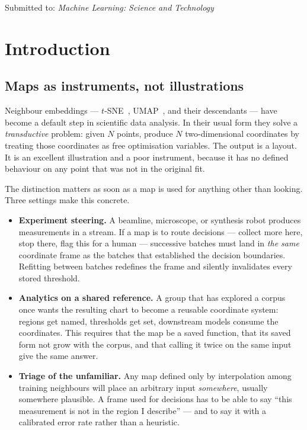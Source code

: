 \documentclass[12pt]{iopart}
\makeatletter
\gdef\lm@title{}\gdef\lm@author{}\gdef\lm@addr{}\gdef\lm@sub{}
\newcommand{\submitto}[1]{\gdef\lm@sub{\par\medskip\small Submitted to: #1}}
\newcommand{\MLST}{\emph{Machine Learning: Science and Technology}}
\renewcommand{\maketitle}{%
    \begin{center}%
      {\LARGE\bfseries\lm@title\par}\medskip
      {\large\lm@author\par}%
      \lm@addr
      \lm@sub
    \end{center}%
    \medskip\unvbox\lm@absbox\medskip\par}
\theoremstyle{definition}
\theoremstyle{plain}
\theoremstyle{remark}
\makeatother
\begin{document}
\submitto{\MLST}

\maketitle

\ifiopclass\else\tableofcontents\newpage\fi

\section{Introduction}
\label{sec:intro}

\subsection{Maps as instruments, not illustrations}

Neighbour embeddings --- $t$-SNE~\cite{vandermaaten2008tsne},
UMAP~\cite{mcinnes2018umap}, and their descendants --- have become a default
step in scientific data analysis. In their usual form they solve a
\emph{transductive} problem: given $N$ points, produce $N$ two-dimensional
coordinates by treating those coordinates as free optimisation variables. The
output is a layout. It is an excellent illustration and a poor instrument,
because it has no defined behaviour on any point that was not in the original
fit.

The distinction matters as soon as a map is used for anything other than
looking. Three settings make this concrete.

\begin{itemize}[leftmargin=*]
\item \textbf{Experiment steering.} A beamline, microscope, or synthesis robot
  produces measurements in a stream. If a map is to route decisions --- collect
  more here, stop there, flag this for a human --- successive batches must land
  in \emph{the same} coordinate frame as the batches that established the
  decision boundaries. Refitting between batches redefines the frame and
  silently invalidates every stored threshold.
\item \textbf{Analytics on a shared reference.} A group that has explored a
  corpus once wants the resulting chart to become a reusable coordinate system:
  regions get named, thresholds get set, downstream models consume the
  coordinates. This requires that the map be a saved function, that its saved
  form not grow with the corpus, and that calling it twice on the same input
  give the same answer.
\item \textbf{Triage of the unfamiliar.} Any map defined only by interpolation
  among training neighbours will place an arbitrary input \emph{somewhere},
  usually somewhere plausible. A frame used for decisions has to be able to say
  ``this measurement is not in the region I describe'' --- and to say it with a
  calibrated error rate rather than a heuristic.
\end{itemize}
\end{document}

